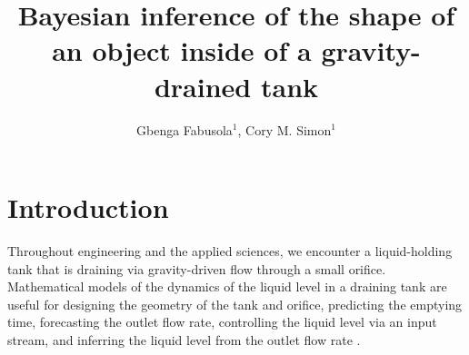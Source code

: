 \documentclass[openacc]{rsproca_new}%
\begin{document}
\title{Bayesian inference of the shape of an object inside of a gravity-drained tank}

\author{%
Gbenga Fabusola$^{1}$, 
Cory M. Simon$^{1}$
}

\address{$^{1}$School of Chemical, Biological, and Environmental Engineering. Oregon State University. Corvallis, OR, USA.
}

\subject{applied mathematics, chemical engineering}



\begin{abstract}

\absbreak %
\end{abstract}

\rsbreak


\section{Introduction}
Throughout engineering and the applied sciences, we encounter a liquid-holding tank that is draining via gravity-driven flow through a small orifice.
Mathematical models of the dynamics of the liquid level in a draining tank are useful for designing the geometry of the tank and orifice, predicting the emptying time, forecasting the outlet flow rate, controlling the liquid level via an input stream, and inferring the liquid level from the outlet flow rate \cite{d2021torricelli,seborg2016process,groetsch1993inverse,groetsch1999inverse}.
\end{document}
